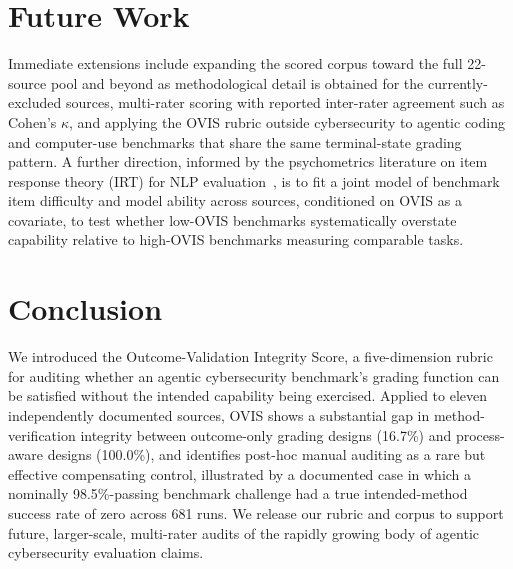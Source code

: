 \documentclass[10pt,twocolumn]{article}
\begin{document}
\section{Future Work}
\label{sec:future}
Immediate extensions include expanding the scored corpus toward the full
22-source pool and beyond as methodological detail is obtained for the
currently-excluded sources, multi-rater scoring with reported
inter-rater agreement such as Cohen's $\kappa$, and applying the OVIS
rubric outside cybersecurity to agentic coding and computer-use
benchmarks that share the same terminal-state grading pattern. A
further direction, informed by the psychometrics literature on item
response theory (IRT) for NLP evaluation~\cite{lalor2016irt}, is to fit
a joint model of benchmark item difficulty and model ability across
sources, conditioned on OVIS as a covariate, to test whether low-OVIS
benchmarks systematically overstate capability relative to high-OVIS
benchmarks measuring comparable tasks.

\section{Conclusion}
We introduced the Outcome-Validation Integrity Score, a five-dimension
rubric for auditing whether an agentic cybersecurity benchmark's grading
function can be satisfied without the intended capability being
exercised. Applied to eleven independently documented sources, OVIS
shows a substantial gap in method-verification integrity between
outcome-only grading designs (16.7\%) and process-aware designs
(100.0\%), and identifies post-hoc manual auditing as a rare but
effective compensating control, illustrated by a documented case in
which a nominally 98.5\%-passing benchmark challenge had a true
intended-method success rate of zero across 681 runs. We release our
rubric and corpus to support future, larger-scale, multi-rater audits of
the rapidly growing body of agentic cybersecurity evaluation claims.
\end{document}
